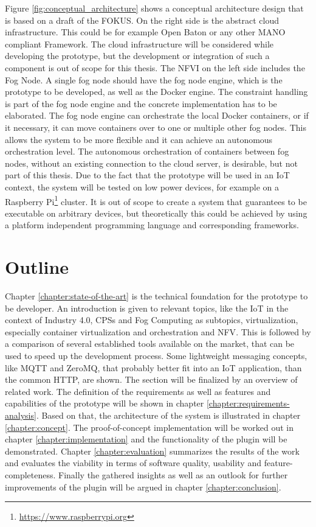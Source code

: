 Figure \ref{fig:conceptual_architecture} shows a conceptual architecture design that is based on a draft of the \ac{FOKUS}.
On the right side is the abstract cloud infrastructure.
This could be for example Open Baton or any other \ac{MANO} compliant Framework.
The cloud infrastructure will be considered while developing the prototype, but the development or integration of such a component is out of scope for this thesis.
The \ac{NFVI} on the left side includes the Fog Node.
A single fog node should have the fog node engine, which is the prototype to be developed, as well as the Docker engine.
The constraint handling is part of the fog node engine and the concrete implementation has to be elaborated.
The fog node engine can orchestrate the local Docker containers, or if it necessary, it can move containers over to one or multiple other fog nodes.
This allows the system to be more flexible and it can achieve an autonomous orchestration level.
The autonomous orchestration of containers between fog nodes, without an existing connection to the cloud server, is desirable, but not part of this thesis.
Due to the fact that the prototype will be used in an \ac{IoT} context, the system will be tested on low power devices, for example on a Raspberry Pi\footnote{\url{https://www.raspberrypi.org}} cluster.
It is out of scope to create a system that guarantees to be executable on arbitrary devices, but theoretically this could be achieved by using a platform independent programming language and corresponding frameworks.


\section{Outline}
Chapter \ref{chapter:state-of-the-art} is the technical foundation for the prototype to be developer.
An introduction is given to relevant topics, like the \ac{IoT} in the context of Industry 4.0, \acp{CPS} and Fog Computing as subtopics, virtualization, especially container virtualization and orchestration and \ac{NFV}.
This is followed by a comparison of several established tools available on the market, that can be used to speed up the development process.
Some lightweight messaging concepts, like \ac{MQTT} and ZeroMQ, that probably better fit into an \ac{IoT} application, than the common \ac{HTTP}, are shown.
The section will be finalized by an overview of related work.
The definition of the requirements as well as features and capabilities of the prototype will be shown in chapter \ref{chapter:requirements-analysis}.
Based on that, the architecture of the system is illustrated in chapter \ref{chapter:concept}.
The proof-of-concept implementation will be worked out in chapter \ref{chapter:implementation} and the functionality of the plugin will be demonstrated.
Chapter \ref{chapter:evaluation} summarizes the results of the work and evaluates the viability in terms of software quality, usability and feature-completeness.
Finally the gathered insights as well as an outlook for further improvements of the plugin will be argued in chapter \ref{chapter:conclusion}.


